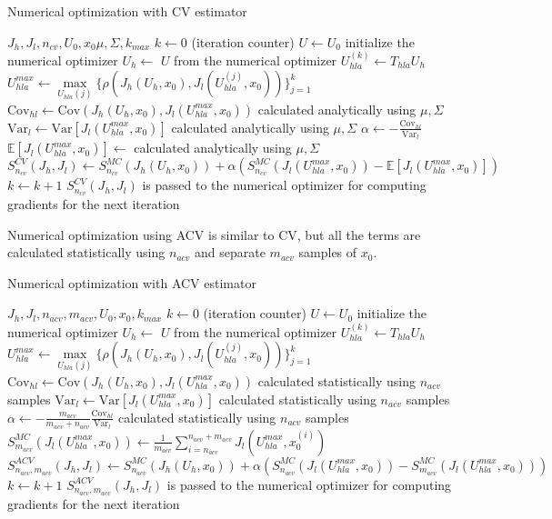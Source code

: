 \documentclass{article}
\begin{document}
\begin{algorithm}
  \caption{Numerical optimization with CV estimator}
  \begin{algorithmic}
    \Require $J_h, J_l, n_{cv}, U_0, x_0 \mu, \Sigma, k_{max}$
    \State $k \gets 0$ (iteration counter)
    \State $U \gets U_0$ initialize the numerical optimizer
    \State $U_h \gets$ $U$ from the numerical optimizer
    \State $U_{hla}^{(k)} \gets T_{hla} U_h$
    \State $U_{hla}^{max} \gets \underset{U_{hla}(j)} \max \{\rho(J_h(U_h, x_0), J_l(U_{hla}^{(j)}, x_0))\}_{j=1}^k$
    \State $\text{Cov}_{hl} \gets \text{Cov}(J_h(U_h, x_0), J_l(U_{hla}^{max}, x_0))$ calculated analytically using $\mu, \Sigma$
    \State $\text{Var}_l \gets \text{Var}[J_l(U_{hla}^{max}, x_0)]$ calculated analytically using $\mu, \Sigma$
    \State $\alpha \gets -\frac{\text{Cov}_{hl}}{\text{Var}_l}$
    \State $\mathbb{E}[J_l(U_{hla}^{max}, x_0)] \gets$ calculated analytically using $\mu, \Sigma$
    \State $S_{n_{cv}}^{CV}(J_h, J_l) \gets S_{n_{cv}}^{MC}(J_h(U_h, x_0)) + \alpha (S_{n_{cv}}^{MC}(J_l(U_{hla}^{max}, x_0)) - \mathbb{E}[J_l(U_{hla}^{max}, x_0)])$
    \State $k \gets k + 1$
    \State $S_{n_{cv}}^{CV}(J_h, J_l)$ is passed to the numerical optimizer for computing gradients for the next iteration
    \EndWhile
  \end{algorithmic}
\end{algorithm}

Numerical optimization using ACV is similar to CV, but all the terms are calculated statistically using $n_{acv}$ and separate
$m_{acv}$ samples of $x_0$.

\begin{algorithm}
  \caption{Numerical optimization with ACV estimator}
  \begin{algorithmic}
    \Require $J_h, J_l, n_{acv}, m_{acv}, U_0, x_0, k_{max}$
    \State $k \gets 0$ (iteration counter)
    \State $U \gets U_0$ initialize the numerical optimizer
    \State $U_h \gets$ $U$ from the numerical optimizer
    \State $U_{hla}^{(k)} \gets T_{hla} U_h$
    \State $U_{hla}^{max} \gets \underset{U_{hla}(j)} \max \{\rho(J_h(U_h, x_0), J_l(U_{hla}^{(j)}, x_0))\}_{j=1}^k$
    \State $\text{Cov}_{hl} \gets \text{Cov}(J_h(U_h, x_0), J_l(U_{hla}^{max}, x_0))$ calculated statistically using $n_{acv}$ samples
    \State $\text{Var}_l \gets \text{Var}[J_l(U_{hla}^{max}, x_0)]$ calculated statistically using $n_{acv}$ samples
    \State $\alpha \gets -\frac{m_{acv}}{m_{acv} + n_{acv}} \frac{\text{Cov}_{hl}}{\text{Var}_l}$ calculated statistically using $n_{acv}$ samples
    \State $S_{m_{acv}}^{MC}(J_l(U_{hla}^{max}, x_0)) \gets \frac{1}{m_{acv}} \sum_{i=n_{acv}}^{n_{acv}+m_{acv}} J_l(U_{hla}^{max}, x_0^{(i)})$
    \State $S_{n_{acv},m_{acv}}^{ACV}(J_h, J_l) \gets S_{n_{acv}}^{MC}(J_h(U_h, x_0)) + \alpha (S_{n_{acv}}^{MC}(J_l(U_{hla}^{max}, x_0)) - S_{m_{acv}}^{MC}(J_l(U_{hla}^{max}, x_0)))$
    \State $k \gets k + 1$
    \State $S_{n_{acv},m_{acv}}^{ACV}(J_h, J_l)$ is passed to the numerical optimizer for computing gradients for the next iteration
    \EndWhile
  \end{algorithmic}
\end{algorithm}
\end{document}

